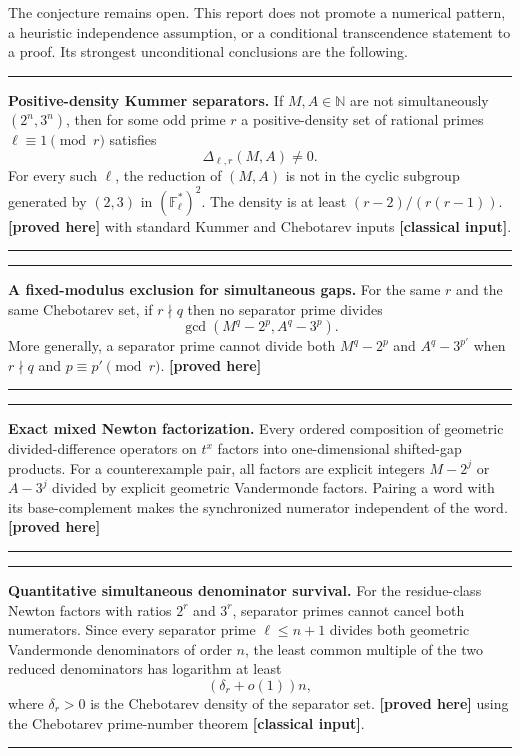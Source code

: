 \documentclass[11pt,oneside]{article}
\theoremstyle{definition}
\theoremstyle{remark}
\newcommand{\N}{\mathbb N}
\newcommand{\F}{\mathbb F}
\newcommand{\statusproved}{\textcolor{proofgreen}{\textbf{[proved here]}}}
\newcommand{\statusclassical}{\textcolor{classicalblue}{\textbf{[classical input]}}}
\newenvironment{resultbox}
{\begin{center}\begin{minipage}{0.94\textwidth}\hrule\vspace{0.45em}}
{\vspace{0.35em}\hrule\end{minipage}\end{center}}
\begin{document}
The conjecture remains open.  This report does not promote a numerical pattern, a heuristic
independence assumption, or a conditional transcendence statement to a proof.  Its strongest
unconditional conclusions are the following.

\begin{resultbox}
\textbf{Positive-density Kummer separators.}
If $M,A\in\N$ are not simultaneously $(2^n,3^n)$, then for some odd prime $r$ a positive-density
set of rational primes $\ell\equiv1\pmod r$ satisfies
\[
 \Delta_{\ell,r}(M,A)\ne0.
\]
For every such $\ell$, the reduction of $(M,A)$ is not in the cyclic subgroup generated by
$(2,3)$ in $(\F_\ell^*)^2$.  The density is at least
$(r-2)/(r(r-1))$.  \statusproved{} with standard Kummer and Chebotarev inputs
\statusclassical.
\end{resultbox}

\begin{resultbox}
\textbf{A fixed-modulus exclusion for simultaneous gaps.}
For the same $r$ and the same Chebotarev set, if $r\nmid q$ then no separator prime divides
\[
  \gcd(M^q-2^p,A^q-3^p).
\]
More generally, a separator prime cannot divide both $M^q-2^p$ and $A^q-3^{p'}$ when
$r\nmid q$ and $p\equiv p'\pmod r$.  \statusproved
\end{resultbox}

\begin{resultbox}
\textbf{Exact mixed Newton factorization.}
Every ordered composition of geometric divided-difference operators on $t^x$ factors into
one-dimensional shifted-gap products.  For a counterexample pair, all factors are explicit
integers $M-2^j$ or $A-3^j$ divided by explicit geometric Vandermonde factors.  Pairing a word
with its base-complement makes the synchronized numerator independent of the word.
\statusproved
\end{resultbox}

\begin{resultbox}
\textbf{Quantitative simultaneous denominator survival.}
For the residue-class Newton factors with ratios $2^r$ and $3^r$, separator primes cannot
cancel both numerators.  Since every separator prime $\ell\le n+1$ divides both geometric
Vandermonde denominators of order $n$, the least common multiple of the two reduced
denominators has logarithm at least
\[
  (\delta_r+o(1))n,
\]
where $\delta_r>0$ is the Chebotarev density of the separator set.  \statusproved{} using the
Chebotarev prime-number theorem \statusclassical.
\end{resultbox}
\end{document}
